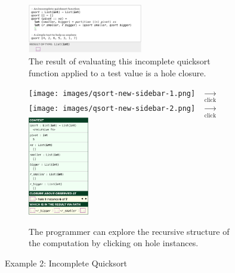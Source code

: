
\begin{figure}[t]
\begin{subfigure}[t]{\textwidth}
\centering
\includegraphics[width=0.55\textwidth,interpolate=false,valign=t]{images/qsort-code.png}
\vspace{-3px}
\caption{The result of evaluating this incomplete quicksort function applied to a test value is a hole closure.}
\label{fig:qsort-example-code}
\end{subfigure}

\vspace{10px}

\begin{subfigure}[t]{\textwidth}
\centering
\texttt{[image: images/qsort-new-sidebar-1.png]}
~$\xrightarrow[\text{click}]{}$
\texttt{[image: images/qsort-new-sidebar-2.png]}
~$\xrightarrow[\text{click}]{}$
\includegraphics[width=0.29\textwidth,interpolate=false,valign=c]{images/qsort-new-sidebar-3.png}
\caption{The programmer can explore the recursive structure of the computation by clicking on hole instances.}
\label{fig:qsort-sidebars}
\end{subfigure}

\vspace{3px}

\caption{Example 2: Incomplete Quicksort}
\label{fig:qsort-cell-mockup}
\end{figure}



